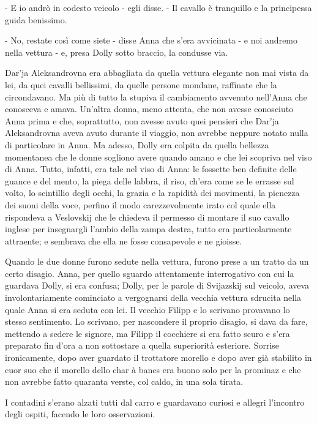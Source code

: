 - E io andrò in codesto veicolo - egli disse. - Il cavallo è tranquillo e la principessa guida benissimo. 

- No, restate così come siete - disse Anna che s'era avvicinata - e noi andremo nella vettura - e, presa Dolly sotto braccio, la condusse via. 

Dar'ja Aleksandrovna era abbagliata da quella vettura elegante non mai vista da lei, da quei cavalli bellissimi, da quelle persone mondane, raffinate che la circondavano. Ma più di tutto la stupiva il cambiamento avvenuto nell'Anna che conosceva e amava. Un'altra donna, meno attenta, che non avesse conosciuto Anna prima e che, soprattutto, non avesse avuto quei pensieri che Dar'ja Aleksandrovna aveva avuto durante il viaggio, non avrebbe neppure notato nulla di particolare in Anna. Ma adesso, Dolly era colpita da quella bellezza momentanea che le donne sogliono avere quando amano e che lei scopriva nel viso di Anna. Tutto, infatti, era tale nel viso di Anna: le fossette ben definite delle guance e del mento, la piega delle labbra, il riso, ch'era come se le errasse sul volto, lo scintillio degli occhi, la grazia e la rapidità dei movimenti, la pienezza dei suoni della voce, perfino il modo carezzevolmente irato col quale ella rispondeva a Veslovskij che le chiedeva il permesso di montare il suo cavallo inglese per insegnargli l'ambio della zampa destra, tutto era particolarmente attraente; e sembrava che ella ne fosse consapevole e ne gioisse. 

Quando le due donne furono sedute nella vettura, furono prese a un tratto da un certo disagio. Anna, per quello sguardo attentamente interrogativo con cui la guardava Dolly, si era confusa; Dolly, per le parole di Svijazskij sul veicolo, aveva involontariamente cominciato a vergognarsi della vecchia vettura sdrucita nella quale Anna si era seduta con lei. Il vecchio Filipp e lo scrivano provavano lo stesso sentimento. Lo scrivano, per nascondere il proprio disagio, si dava da fare, mettendo a sedere le signore, ma Filipp il cocchiere si era fatto scuro e s'era preparato fin d'ora a non sottostare a quella superiorità esteriore. Sorrise ironicamente, dopo aver guardato il trottatore morello e dopo aver già stabilito in cuor suo che il morello dello char à bancs era buono solo per la prominaz e che non avrebbe fatto quaranta verste, col caldo, in una sola tirata. 

I contadini s'erano alzati tutti dal carro e guardavano curiosi e allegri l'incontro degli ospiti, facendo le loro osservazioni. 

